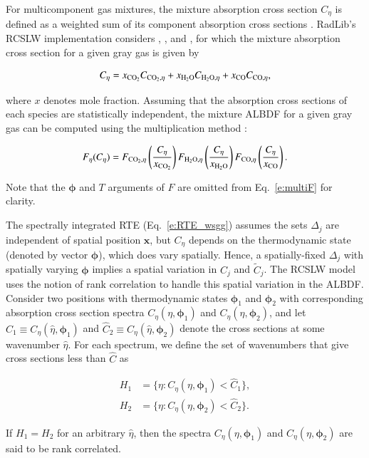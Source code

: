 \documentclass[preprint,12pt]{elsarticle}
\newcommand{\BS}{\boldsymbol}
\begin{document}
    For multicomponent gas mixtures, the mixture absorption cross section $C_{\eta}$ is defined as a weighted sum of
    its component absorption cross sections \cite{Solovjov_2000}. RadLib's RCSLW implementation considers ,
    , and , for which the mixture absorption cross section for a given gray gas is given by
%
    \begin{linenomath}
        \begin{equation}
            \label{e:multiC}
            C_{\eta} = x_{\ce{CO2}}C_{\ce{CO2},\eta} + x_{\ce{H2O}}C_{\ce{H2O},\eta} + x_{\ce{CO}}C_{\ce{CO},\eta},
        \end{equation}
    \end{linenomath}
%
    where $x$ denotes mole fraction.
    Assuming that the absorption cross sections of each species are statistically independent, the mixture ALBDF for a given gray gas can be computed using the multiplication method \cite{Solovjov_2000}:
%
    \begin{linenomath}
        \begin{equation}
            \label{e:multiF}
            F_{\eta}(C_{\eta}) = F_{\ce{CO2},\eta} \left( \frac{C_{\eta}}{x_{\ce{CO2}}} \right) F_{\ce{H2O},\eta} \left( \frac{C_{\eta}}{x_{\ce{H2O}}} \right) F_{\ce{CO},\eta} \left( \frac{C_{\eta}}{x_{\ce{CO}}} \right).
        \end{equation}
    \end{linenomath}
%
    Note that the $\BS{\phi}$ and $T$ arguments of $F$ are omitted from Eq.~\ref{e:multiF} for clarity.

    The spectrally integrated RTE (Eq.~\ref{e:RTE_wsgg}) assumes the sets $\Delta_j$ are independent of spatial position $\mathbf{x}$, but $C_\eta$ depends on the thermodynamic state (denoted by vector $\BS{\phi}$), which does vary spatially.
    Hence, a spatially-fixed $\Delta_j$ with spatially varying $\BS{\phi}$ implies a spatial variation in $C_j$ and
    $\tilde{C}_j$.
    The RCSLW model uses the notion of rank correlation to handle this spatial variation in the ALBDF.
    Consider two positions with thermodynamic states $\BS{\phi}_1$ and $\BS{\phi}_2$ with corresponding absorption
    cross section spectra $C_\eta(\eta,\BS{\phi}_1)$ and $C_\eta(\eta,\BS{\phi}_2)$, and let $\hat{C}_1\equiv C_\eta
    (\hat{\eta},\BS{\phi}_1)$ and $\hat{C}_2\equiv C_\eta(\hat{\eta},\BS{\phi}_2)$ denote the cross sections at some
    wavenumber $\hat{\eta}$. For each spectrum, we define the set of wavenumbers that give cross sections less than
    $\hat{C}$ as
%
    \begin{linenomath}
        \begin{align}
            H_1&=\{\eta: C_\eta(\eta,\BS{\phi}_1)<\hat{C}_1\}, \\
            H_2&=\{\eta: C_\eta(\eta,\BS{\phi}_2)<\hat{C}_2\}.
        \end{align}
    \end{linenomath}
%
    If $H_1=H_2$ for an arbitrary $\hat{\eta}$, then the spectra $C_\eta(\eta,\BS{\phi}_1)$ and $C_\eta(\eta,\BS{\phi}_2)$ are said to be rank correlated.
\end{document}
